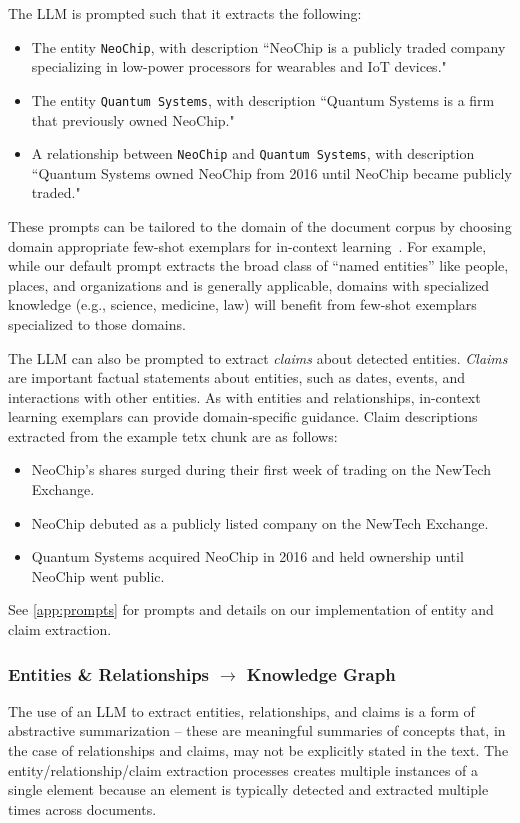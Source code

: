 \documentclass{article}
\begin{document}
The LLM is prompted such that it extracts the following:
\begin{itemize}
    \item The entity \texttt{NeoChip}, with description ``NeoChip is a publicly traded company specializing in low-power processors for wearables and IoT devices."
    \item The entity \texttt{Quantum Systems}, with description ``Quantum Systems is a firm that previously owned NeoChip."
    \item A relationship between \texttt{NeoChip} and \texttt{Quantum Systems}, with description ``Quantum Systems owned NeoChip from 2016 until NeoChip became publicly traded."
\end{itemize}
These prompts can be tailored to the domain of the document corpus by choosing domain appropriate few-shot exemplars for in-context learning~\citep{brown2020language}.
For example, while our default prompt extracts the broad class of ``named entities'' like people, places, and organizations and is generally applicable, domains with specialized knowledge (e.g., science, medicine, law) will benefit from few-shot exemplars specialized to those domains.

The LLM can also be prompted to extract \emph{claims} about detected entities.
\emph{Claims} are important factual statements about entities, such as dates, events, and interactions with other entities.
As with entities and relationships, in-context learning exemplars can provide domain-specific guidance. Claim descriptions extracted from the example tetx chunk are as follows:
\begin{itemize}
    \item NeoChip's shares surged during their first week of trading on the NewTech Exchange.
    \item NeoChip debuted as a publicly listed company on the NewTech Exchange.
    \item Quantum Systems acquired NeoChip in 2016 and held ownership until NeoChip went public.
\end{itemize}

See \autoref{app:prompts} for prompts and details on our implementation of entity and claim extraction.

\subsubsection{Entities \& Relationships \texorpdfstring{$\rightarrow$}{-->} Knowledge Graph}
The use of an LLM to extract entities, relationships, and claims is a form of abstractive summarization -- these are meaningful summaries of concepts that, in the case of relationships and claims, may not be explicitly stated in the text.
The entity/relationship/claim extraction processes creates multiple instances of a single element because an element is typically detected and extracted multiple times across documents.
\end{document}
